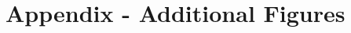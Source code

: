 \documentclass{article}
\begin{document}
%
%
%
%
%

%
\newpage
\section{Appendix - Additional Figures}
\label{sec:Appendix}
\end{document}

